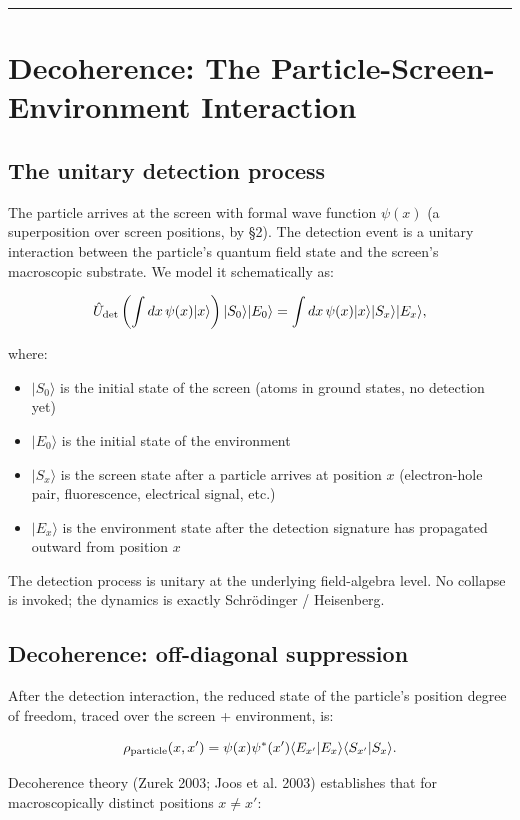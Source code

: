 \documentclass[11pt,a4paper]{article}
\begin{document}
\medskip\hrule\medskip

\section{Decoherence: The Particle-Screen-Environment Interaction}

\subsection{The unitary detection process}

The particle arrives at the screen with formal wave function $\psi(x)$ (a superposition over screen positions, by §2). The detection event is a unitary interaction between the particle's quantum field state and the screen's macroscopic substrate. We model it schematically as:

\[
\hat{U}_{\rm det}\left(\int dx \,\psi(x)|x\rangle\right)|S_0\rangle|E_0\rangle = \int dx\, \psi(x) |x\rangle |S_x\rangle |E_x\rangle,
\]

where:
\begin{itemize}
  \item $|S_0\rangle$ is the initial state of the screen (atoms in ground states, no detection yet)
  \item $|E_0\rangle$ is the initial state of the environment
  \item $|S_x\rangle$ is the screen state after a particle arrives at position $x$ (electron-hole pair, fluorescence, electrical signal, etc.)
  \item $|E_x\rangle$ is the environment state after the detection signature has propagated outward from position $x$
\end{itemize}

The detection process is unitary at the underlying field-algebra level. No collapse is invoked; the dynamics is exactly Schrödinger / Heisenberg.

\subsection{Decoherence: off-diagonal suppression}

After the detection interaction, the reduced state of the particle's position degree of freedom, traced over the screen + environment, is:

\[
\rho_{\rm particle}(x, x') = \psi(x) \psi^*(x') \langle E_{x'} | E_x \rangle \langle S_{x'} | S_x \rangle.
\]

Decoherence theory (Zurek 2003; Joos et al. 2003) establishes that for macroscopically distinct positions $x \ne x'$:
\end{document}
